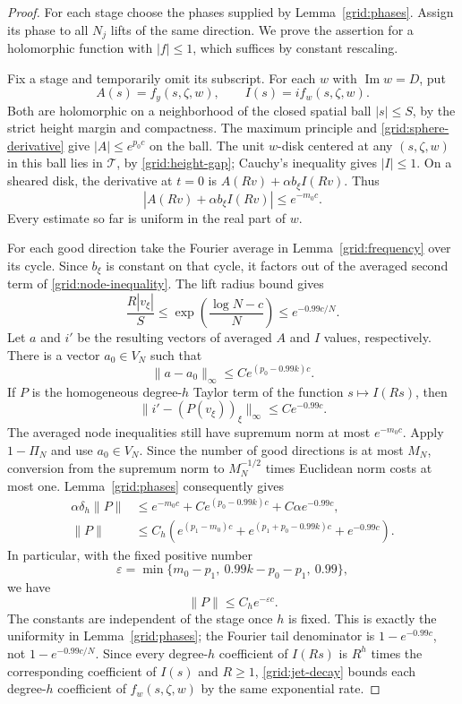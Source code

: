 \begin{proof}
For each stage choose the phases supplied by
Lemma~\ref{grid:phases}.  Assign its phase to all $N_j$ lifts of
the same direction.  We prove the assertion for a holomorphic
function with $|f|\le1$, which suffices by constant rescaling.

Fix a stage and temporarily omit its subscript.  For each $w$ with
$\operatorname{Im}w=D$, put
\[
 A(s)=f_y(s,\zeta,w),\qquad I(s)=i f_w(s,\zeta,w).
\]
Both are holomorphic on a neighborhood of the closed spatial ball
$|s|\le S$, by the strict height margin and compactness.  The
maximum principle and \eqref{grid:sphere-derivative} give
$|A|\le e^{p_0c}$ on the ball.  The unit $w$-disk centered at any
$(s,\zeta,w)$ in this ball lies in $\mathcal T$, by
\eqref{grid:height-gap}; Cauchy's inequality gives $|I|\le1$.
On a sheared disk, the derivative at $t=0$ is
$A(Rv)+\alpha b_\xi I(Rv)$.  Thus
\begin{equation}
 \label{grid:node-inequality}
 |A(Rv)+\alpha b_\xi I(Rv)|\le e^{-m_0c}.
\end{equation}
Every estimate so far is uniform in the real part of $w$.

For each good direction take the Fourier average in
Lemma~\ref{grid:frequency} over its cycle.  Since $b_\xi$ is
constant on that cycle, it factors out of the averaged second
term of \eqref{grid:node-inequality}.  The lift radius bound gives
\[
 \frac{R|v_\xi|}{S}
 \le\exp\left(\frac{\log N-c}{N}\right)
 \le e^{-0.99c/N}.
\]
Let $a$ and $i'$ be the resulting vectors of averaged $A$ and $I$
values, respectively.  There is a vector $a_0\in V_N$ such that
\[
 \|a-a_0\|_\infty\le C e^{(p_0-0.99k)c}.
\]
If $P$ is the homogeneous degree-$h$ Taylor term of the function
$s\mapsto I(Rs)$, then
\[
 \bigl\|i'-(P(v_\xi))_\xi\bigr\|_\infty
       \le C e^{-0.99c}.
\]
The averaged node inequalities still have supremum norm at most
$e^{-m_0c}$.  Apply $1-\Pi_N$ and use $a_0\in V_N$.  Since the
number of good directions is at most $M_N$, conversion from the
supremum norm to $M_N^{-1/2}$ times Euclidean norm costs at most
one.  Lemma~\ref{grid:phases} consequently gives
\[
 \begin{split}
 \alpha\delta_h\|P\|
 &\le e^{-m_0c}
       +C e^{(p_0-0.99k)c}
       +C\alpha e^{-0.99c},\\
 \|P\|
 &\le C_h\left(
       e^{(p_1-m_0)c}
       +e^{(p_1+p_0-0.99k)c}
       +e^{-0.99c}\right).
 \end{split}
\]
In particular, with the fixed positive number
\[
 \varepsilon=\min\{m_0-p_1,\ 0.99k-p_0-p_1,\ 0.99\},
\]
we have
\begin{equation}
 \label{grid:jet-decay}
 \|P\|\le C_h e^{-\varepsilon c}.
\end{equation}
The constants are independent of the stage once $h$ is fixed.
This is exactly the uniformity in Lemma~\ref{grid:phases}; the
Fourier tail denominator is $1-e^{-0.99c}$, not
$1-e^{-0.99c/N}$.  Since every degree-$h$ coefficient of $I(Rs)$
is $R^h$ times the corresponding coefficient of $I(s)$ and
$R\ge1$, \eqref{grid:jet-decay} bounds each degree-$h$ coefficient
of $f_w(s,\zeta,w)$ by the same exponential rate.


\end{proof}
